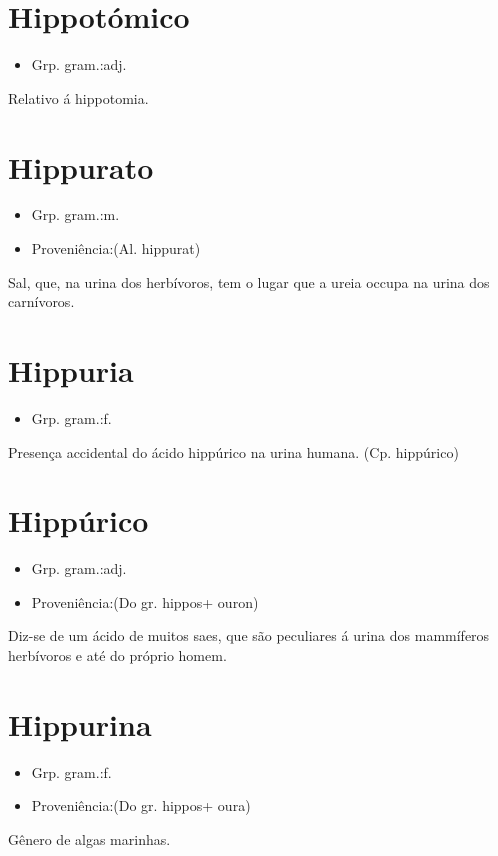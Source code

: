 \documentclass{article}
\begin{document}
\section{Hippotómico}
\begin{itemize}
\item {Grp. gram.:adj.}
\end{itemize}
Relativo á hippotomia.
\section{Hippurato}
\begin{itemize}
\item {Grp. gram.:m.}
\end{itemize}
\begin{itemize}
\item {Proveniência:(Al. \textunderscore hippurat\textunderscore )}
\end{itemize}
Sal, que, na urina dos herbívoros, tem o lugar que a ureia occupa na urina dos carnívoros.
\section{Hippuria}
\begin{itemize}
\item {Grp. gram.:f.}
\end{itemize}
Presença accidental do ácido hippúrico na urina humana.
(Cp. \textunderscore hippúrico\textunderscore )
\section{Hippúrico}
\begin{itemize}
\item {Grp. gram.:adj.}
\end{itemize}
\begin{itemize}
\item {Proveniência:(Do gr. \textunderscore hippos\textunderscore  + \textunderscore ouron\textunderscore )}
\end{itemize}
Diz-se de um ácido de muitos saes, que são peculiares á urina dos mammíferos herbívoros e até do próprio homem.
\section{Hippurina}
\begin{itemize}
\item {Grp. gram.:f.}
\end{itemize}
\begin{itemize}
\item {Proveniência:(Do gr. \textunderscore hippos\textunderscore  + \textunderscore oura\textunderscore )}
\end{itemize}
Gênero de algas marinhas.
\end{document}

